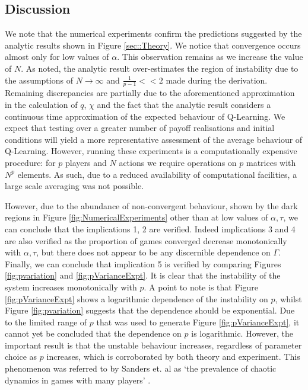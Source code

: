 \documentclass[sigconf,anonymous]{aamas}
\begin{document}
\subsection{Discussion}
    
We note that the numerical experiments confirm the predictions suggested by the analytic results shown in Figure \ref{sec::Theory}. We notice that convergence occurs almost only for low values of $\alpha$. This observation remains as we increase the value of $N$. As noted, the analytic result over-estimates the region of instability due to the assumptions of $N \rightarrow \infty$ and $\frac{1}{p-1} << 2$ made during the derivation. Remaining discrepancies are partially due to the aforementioned approximation in the calculation of $q$, $\chi$ and the fact that the analytic result considers a continuous time approximation of the expected behaviour of Q-Learning. We expect that testing over a greater number of payoff realisations and initial conditions will yield a more representative assessment of the average behaviour of Q-Learning. However, running these experiments is a computationally expensive procedure: for $p$ players and $N$ actions we require operations on $p$ matrices with $N^{p}$ elements. As such, due to a reduced availability of computational facilities, a large scale averaging was not possible.

However, due to the abundance of non-convergent behaviour, shown by the dark regions in Figure \ref{fig:NumericalExperiments} other than at low values of $\alpha, \tau$, we can conclude that the implications 1, 2 are verified. Indeed implications 3 and 4 are also verified as the proportion of games converged decrease monotonically with $\alpha, \tau$, but there does not appear to be any discernible dependence on $\Gamma$. Finally, we can conclude that implication 5 is verified by comparing Figures \ref{fig:pvariation} and \ref{fig:pVarianceExpt}. It is clear that the instability of the system increases monotonically with $p$. A point to note is that Figure \ref{fig:pVarianceExpt} shows a logarithmic dependence of the instability on $p$, whilst Figure \ref{fig:pvariation} suggests that the dependence should be exponential. Due to the limited range of $p$ that was used to generate Figure \ref{fig:pVarianceExpt}, it cannot yet be concluded that the dependence on $p$ is logarithmic. However, the important result is that the unstable behaviour increases, regardless of parameter choice as $p$ increases, which is corroborated by both theory and experiment. This phenomenon was referred to by Sanders et. al as `the prevalence of chaotic dynamics in games with many players' \cite{Sanders2018}. 
\end{document}
